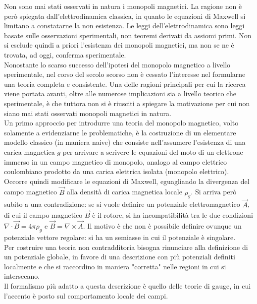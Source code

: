 


Non sono mai stati osservati in natura i monopoli magnetici. La ragione non è però
spiegata dall'elettrodinamica classica, in quanto le equazioni di Maxwell
si limitano a constatarne la non esistenza. Le leggi dell'elettrodinamica
sono leggi basate sulle osservazioni sperimentali, non teoremi derivati da assiomi primi.
Non si esclude quindi a priori l'esistenza dei monopoli magnetici, ma non se ne
è trovata, ad oggi, conferma sperimentale. \\
Nonostante lo scarso successo dell'ipotesi del monopolo magnetico a livello sperimentale,
nel corso del secolo scorso non è cessato l'interesse nel formularne una teoria
completa e consistente. Una delle ragioni principali per cui la ricerca viene
portata avanti, oltre alle numerose implicazioni sia a livello
teorico che sperimentale, è che tuttora non si è riusciti a spiegare la motivazione
per cui non siano mai stati osservati monopoli magnetici in natura.\\

Un primo approccio per introdurre una teoria del monopolo magnetico, volto solamente
a evidenziarne le problematiche, è la costruzione di un elementare modello classico (in maniera
naive) che consiste nell'assumere l'esistenza di una carica magnetica $g$ per arrivare
a scrivere le equazioni del moto di un elettrone immerso in un campo magnetico di
monopolo, analogo al campo elettrico coulombiano prodotto da una carica elettrica isolata
(monopolo elettrico). Occorre quindi modificare le equazioni di Maxwell,
eguagliando la divergenza del campo magnetico $\vec B$ alla densità di carica magnetica
locale $\rho_g$.
Si arriva però subito a una contradizione: se si vuole definire
un potenziale elettromagnetico $\vec A$, di cui il campo magnetico $\vec B$ è il rotore,
si ha incompatibilità tra le due condizioni $\nabla \cdot \vec B = 4 \pi\rho_g$ e
$\vec B = \nabla \times \vec A$. Il motivo è che non è possibile definire ovunque un
potenziale vettore regolare: si ha un semiasse in cui il potenziale è singolare.\\

Per costruire una teoria non contradditoria bisogna rinunciare alla definizione
di un potenziale globale, in favore di una descrizione con più potenziali definiti
localmente e che si raccordino in maniera "corretta" nelle regioni in cui si intersecano.\\
Il formalismo più adatto a questa descrizione è quello delle teorie di gauge, in
cui l'accento è posto sul comportamento locale dei campi.\\

